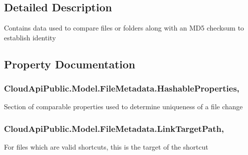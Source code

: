 \subsection{Detailed Description}
Contains data used to compare files or folders along with an M\-D5 checksum to establish identity 



\subsection{Property Documentation}
\hypertarget{class_cloud_api_public_1_1_model_1_1_file_metadata_aa40b8886d1ecaf346722de47c9ec5c29}{
\subsubsection[{Hashable\-Properties}]{ Cloud\-Api\-Public.\-Model.\-File\-Metadata.\-Hashable\-Properties\hspace{0.3cm}{\ttfamily [get]}, {\ttfamily [set]}}}\label{class_cloud_api_public_1_1_model_1_1_file_metadata_aa40b8886d1ecaf346722de47c9ec5c29}


Section of comparable properties used to determine uniqueness of a file change 

\hypertarget{class_cloud_api_public_1_1_model_1_1_file_metadata_a633d3003a1d5d3f5f43e722516fd466b}{
\subsubsection[{Link\-Target\-Path}]{ Cloud\-Api\-Public.\-Model.\-File\-Metadata.\-Link\-Target\-Path\hspace{0.3cm}{\ttfamily [get]}, {\ttfamily [set]}}}\label{class_cloud_api_public_1_1_model_1_1_file_metadata_a633d3003a1d5d3f5f43e722516fd466b}


For files which are valid shortcuts, this is the target of the shortcut 

